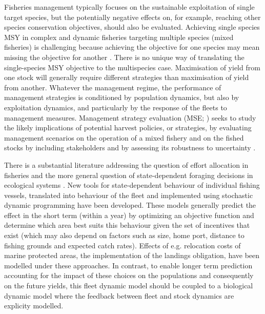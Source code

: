 \documentclass[12pt,oneline,a4paper,numbib]{ouparticle}
\numberwithin{equation}{subsection} %
\begin{document}
Fisheries management typically focuses on the sustainable exploitation of single target species, but the potentially negative effects on, for example, reaching other species conservation objectives, should also be evaluated. Achieving single species MSY in complex and dynamic fisheries targeting multiple species (mixed fisheries) is challenging because achieving the objective for one species may mean missing the objective for another \cite{Ulrich2017}. There is no unique way of translating the single-species MSY objective to the multispecies case. Maximisation of yield from one stock will generally require different strategies than maximisation of yield from another.  Whatever the management regime, the performance of management strategies is conditioned by population dynamics, but also by exploitation dynamics, and particularly by the response of the fleets to management measures. Management strategy evaluation (MSE; \cite{Sainsbury2000, Smith1994, Venables2009}) seeks to study the likely implications of potential harvest policies, or strategies, by evaluating management scenarios on the operation of a mixed fishery and on the fished stocks by including stakeholders and by assessing its robustness to uncertainty \cite{Andersen2010, Kell2007, Prellezo2016, Punt2016}. 

There is a substantial literature addressing the question of effort allocation in fisheries and the more general question of state-dependent foraging decisions in ecological systems \cite{ClarkandMangel2000,Houston1999}. New tools for state-dependent behaviour of individual fishing vessels, translated into behaviour of the fleet and implemented using stochastic dynamic programming \cite{Alzorriz2018,Batsleer2015, Dowling2011, Poos2010} have been developed. These models generally predict the effect in the short term (within a year) by optimizing an objective function and determine which area best suits this behaviour given the set of incentives that exist (which may also depend on factors such as size, home port, distance to fishing grounds and expected catch rates). Effects of e.g. relocation costs of marine protected areas, the implementation of the landings obligation, have been modelled under these approaches. In contrast, to enable longer term prediction accounting for the impact of these choices on the populations and consequently on the future yields, this fleet dynamic model should be coupled to a biological dynamic model where the feedback between fleet and stock dynamics are explicity modelled.
\end{document}
